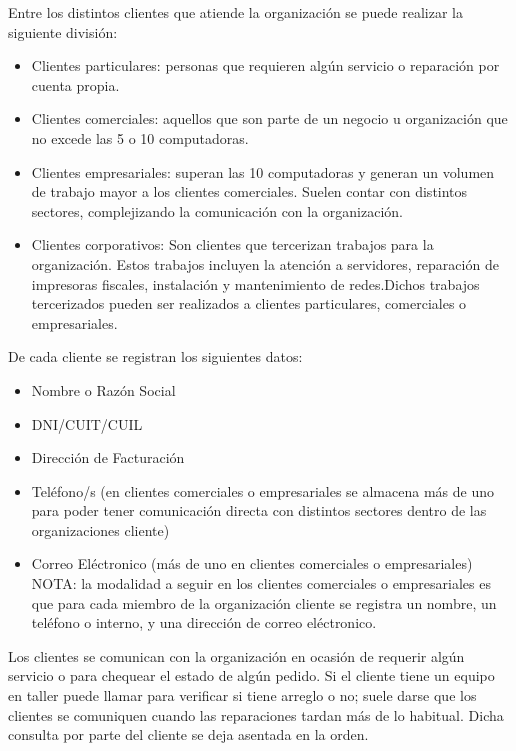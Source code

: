 \documentclass[12pt]{extarticle}
\begin{document}
\begin{spacing}{1.2}
    Entre los distintos clientes que atiende la organización se puede realizar la siguiente división:
    \begin{itemize}
        \item Clientes particulares: personas que requieren algún servicio o reparación por cuenta propia.
        \item Clientes comerciales: aquellos que son parte de un negocio u organización que no excede las 5 o 10 computadoras.
        \item Clientes empresariales: superan las 10 computadoras y generan un volumen de trabajo mayor a los clientes comerciales. Suelen contar con distintos sectores, complejizando la comunicación con la organización.
        \item Clientes corporativos: Son clientes que tercerizan trabajos para la organización. Estos trabajos incluyen la atención a servidores, reparación de impresoras fiscales, instalación y mantenimiento de redes.Dichos trabajos tercerizados pueden ser realizados a clientes particulares, comerciales o empresariales.
    \end{itemize}

    De cada cliente se registran los siguientes datos:
    \begin{itemize}
        \item Nombre o Razón Social
        \item DNI/CUIT/CUIL
        \item Dirección de Facturación
        \item Teléfono/s (en clientes comerciales o empresariales se almacena más de uno para poder tener comunicación directa con distintos sectores dentro de las organizaciones cliente)
        \item Correo Eléctronico (más de uno en clientes comerciales o empresariales)\\
        NOTA: la modalidad a seguir en los clientes comerciales o empresariales es que para cada miembro de la organización cliente se registra un nombre, un teléfono o interno, y una dirección de correo eléctronico.
    \end{itemize}

    Los clientes se comunican con la organización en ocasión de requerir algún servicio o para chequear el estado de algún pedido. Si el cliente tiene un equipo en taller puede llamar para verificar si tiene arreglo o no; suele darse que los clientes se comuniquen cuando las reparaciones tardan más de lo habitual. Dicha consulta por parte del cliente se deja asentada en la orden.\\


\end{spacing}
\end{document}
